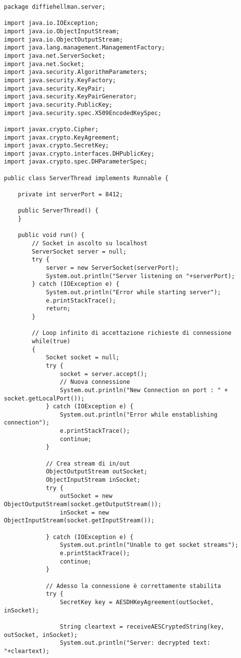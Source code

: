 \documentclass[12pt]{article}
\begin{document}
\begin{lstlisting}
package diffiehellman.server;

import java.io.IOException;
import java.io.ObjectInputStream;
import java.io.ObjectOutputStream;
import java.lang.management.ManagementFactory;
import java.net.ServerSocket;
import java.net.Socket;
import java.security.AlgorithmParameters;
import java.security.KeyFactory;
import java.security.KeyPair;
import java.security.KeyPairGenerator;
import java.security.PublicKey;
import java.security.spec.X509EncodedKeySpec;

import javax.crypto.Cipher;
import javax.crypto.KeyAgreement;
import javax.crypto.SecretKey;
import javax.crypto.interfaces.DHPublicKey;
import javax.crypto.spec.DHParameterSpec;

public class ServerThread implements Runnable {

	private int serverPort = 8412;

	public ServerThread() {
	}

	public void run() {
		// Socket in ascolto su localhost
		ServerSocket server = null;
		try {
			server = new ServerSocket(serverPort);
			System.out.println("Server listening on "+serverPort);
		} catch (IOException e) {
			System.out.println("Error while starting server");
			e.printStackTrace();
			return;
		}

		// Loop infinito di accettazione richieste di connessione
		while(true)
		{
			Socket socket = null;
			try {
				socket = server.accept();
				// Nuova connessione
				System.out.println("New Connection on port : " + socket.getLocalPort());
			} catch (IOException e) {
				System.out.println("Error while enstablishing connection");
				e.printStackTrace();
				continue;
			}

			// Crea stream di in/out
			ObjectOutputStream outSocket;
			ObjectInputStream inSocket;
			try {
				outSocket = new ObjectOutputStream(socket.getOutputStream());
				inSocket = new ObjectInputStream(socket.getInputStream());

			} catch (IOException e) {
				System.out.println("Unable to get socket streams");
				e.printStackTrace();
				continue;
			}

			// Adesso la connessione è correttamente stabilita
			try {
				SecretKey key = AESDHKeyAgreement(outSocket, inSocket);

				String cleartext = receiveAESCryptedString(key, outSocket, inSocket);
				System.out.println("Server: decrypted text: "+cleartext);


\end{lstlisting}
\end{document}
